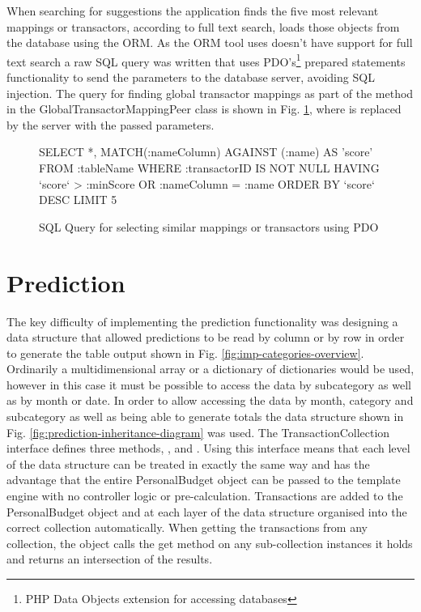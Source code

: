 When searching for suggestions the application finds the five most relevant mappings or transactors, according to full text search, loads those objects from the database using the ORM. As the ORM tool uses doesn't have support for full text search a raw SQL query was written that uses PDO's\footnote{PHP Data Objects extension for accessing databases} prepared statements functionality to send the parameters to the database server, avoiding SQL injection. The query for finding global transactor mappings as part of the  method in the GlobalTransactorMappingPeer class is shown in Fig. \ref{fig:sql-match-query}, where  is replaced by the server with the passed parameters.

\begin{figure}
\centering
\begin{lstinline}[language=sql]
SELECT *, MATCH(:nameColumn) AGAINST (:name) AS 'score'
FROM :tableName
	WHERE :transactorID IS NOT NULL
	HAVING `score` > :minScore OR :nameColumn = :name
ORDER BY `score` DESC
LIMIT 5
\end{lstinline}
\caption{SQL Query for selecting similar mappings or transactors using PDO}
\label{fig:sql-match-query}
\end{figure}

\section{Prediction}
The key difficulty of implementing the prediction functionality was designing a data structure that allowed predictions to be read by column or by row in order to generate the table output shown in Fig. \ref{fig:imp-categories-overview}. Ordinarily a multidimensional array or a dictionary of dictionaries would be used, however in this case it must be possible to access the data by subcategory as well as by month or date.
%
In order to allow accessing the data by month, category and subcategory as well as being able to generate totals the data structure shown in Fig. \ref{fig:prediction-inheritance-diagram} was used. The TransactionCollection interface defines three methods, ,  and . Using this interface means that each level of the data structure can be treated in exactly the same way and has the advantage that the entire PersonalBudget object can be passed to the template engine with no controller logic or pre-calculation. Transactions are added to the PersonalBudget object and at each layer of the data structure organised into the correct collection automatically. When getting the transactions from any collection, the object calls the get  method on any sub-collection instances it holds and returns an intersection of the results.

